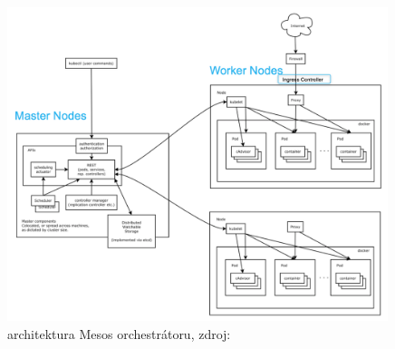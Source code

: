 \begin{figure}[H]
  \begin{centering}
	  \includegraphics[width=0.99\textwidth]{images/k8s-architecture.png}
    \par
	  \caption{architektura Mesos orchestrátoru\label{fig:k8s}, zdroj: }
    \end{centering}
\end{figure}

